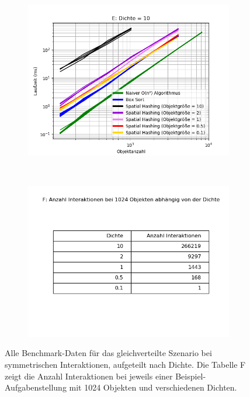 \begin{figure}
\begin{subfigure}[t]{0.55\textwidth}
		\label{fig:symmetricComparison-D}
	\end{subfigure}
~
	\begin{subfigure}[t]{0.55\textwidth}
		\centering
		\includegraphics[width=1\textwidth]{./res/symmetricComparison-E.png}

		\label{fig:symmetricComparison-E}
	\end{subfigure}
~
	\begin{subfigure}[t]{0.55\textwidth}
		\centering
		\includegraphics[width=1\textwidth]{./res/symmetricComparison-F.png}

		\label{fig:symmetricComparison-F}
	\end{subfigure}

	\caption{Alle Benchmark-Daten für das gleichverteilte Szenario bei symmetrischen Interaktionen, aufgeteilt nach Dichte. Die Tabelle F zeigt die Anzahl Interaktionen bei jeweils einer Beispiel-Aufgabenstellung mit 1024 Objekten und verschiedenen Dichten.}
	\label{fig:symmetricComparison}
\end{figure}

